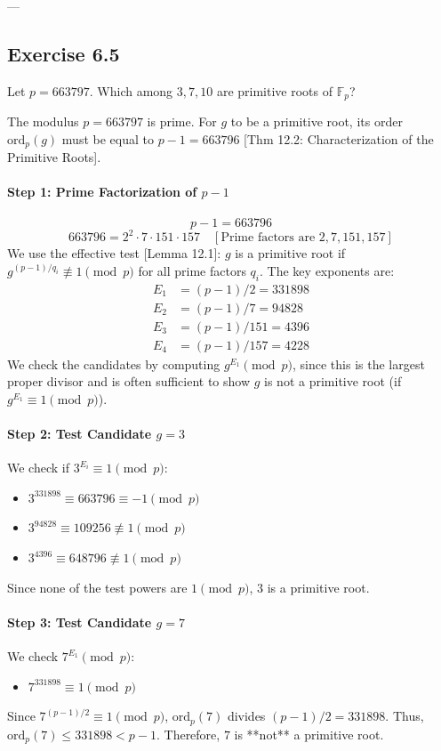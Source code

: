 ---

\subsection*{Exercise 6.5}
Let $p=663797$. Which among $3, 7, 10$ are primitive roots of $\mathbb{F}_{p}$?

\begin{solution}
The modulus $p=663797$ is prime. For $g$ to be a primitive root, its order $\mathrm{ord}_{p}(g)$ must be equal to $p-1 = 663796$ [Thm 12.2: Characterization of the Primitive Roots].

\paragraph{Step 1: Prime Factorization of $p-1$}
$$ p-1 = 663796 $$
$$ 663796 = 2^2 \cdot 7 \cdot 151 \cdot 157 \quad [\text{Prime factors are } 2, 7, 151, 157] \text{} $$
We use the effective test [Lemma 12.1]: $g$ is a primitive root if $g^{(p-1)/q_i} \not\equiv 1 \pmod{p}$ for all prime factors $q_i$. The key exponents are:
\begin{align*}
    E_1 &= (p-1)/2 = 331898 \\
    E_2 &= (p-1)/7 = 94828 \\
    E_3 &= (p-1)/151 = 4396 \\
    E_4 &= (p-1)/157 = 4228
\end{align*}
We check the candidates by computing $g^{E_1} \pmod{p}$, since this is the largest proper divisor and is often sufficient to show $g$ is not a primitive root (if $g^{E_1} \equiv 1 \pmod{p}$).

\paragraph{Step 2: Test Candidate $g=3$}
We check if $3^{E_i} \equiv 1 \pmod{p}$:
\begin{itemize}
    \item $3^{331898} \equiv 663796 \equiv -1 \pmod{p}$
    \item $3^{94828} \equiv 109256 \not\equiv 1 \pmod{p}$
    \item $3^{4396} \equiv 648796 \not\equiv 1 \pmod{p}$
\end{itemize}
Since none of the test powers are $1 \pmod{p}$, $3$ is a primitive root.

\paragraph{Step 3: Test Candidate $g=7$}
We check $7^{E_1} \pmod{p}$:
\begin{itemize}
    \item $7^{331898} \equiv 1 \pmod{p}$
\end{itemize}
Since $7^{(p-1)/2} \equiv 1 \pmod{p}$, $\mathrm{ord}_{p}(7)$ divides $(p-1)/2 = 331898$. Thus, $\mathrm{ord}_{p}(7) \le 331898 < p-1$.
Therefore, $7$ is **not** a primitive root.


\end{solution}
